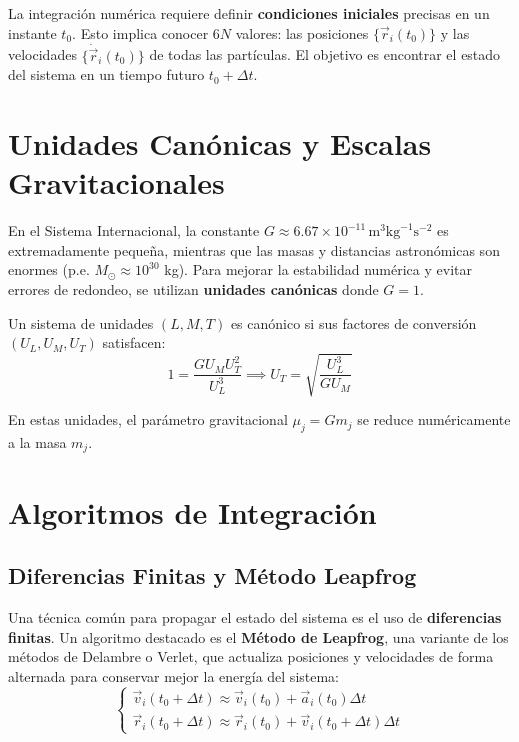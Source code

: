 \documentclass[a4paper]{article}
\begin{document}
La integración numérica requiere definir \textbf{condiciones iniciales} precisas en un instante $t_0$. Esto implica conocer $6N$ valores: las posiciones $\{ \vec{r}_i(t_0) \}$ y las velocidades $\{ \dot{\vec{r}}_i(t_0) \}$ de todas las partículas. El objetivo es encontrar el estado del sistema en un tiempo futuro $t_0 + \Delta t$.

\section{Unidades Canónicas y Escalas Gravitacionales}

En el Sistema Internacional, la constante $G \approx 6.67 \times 10^{-11} \, \text{m}^3\text{kg}^{-1}\text{s}^{-2}$ es extremadamente pequeña, mientras que las masas y distancias astronómicas son enormes (p.e. $M_{\odot} \approx 10^{30}$ kg). Para mejorar la estabilidad numérica y evitar errores de redondeo, se utilizan \textbf{unidades canónicas} donde $G = 1$.

Un sistema de unidades $(L, M, T)$ es canónico si sus factores de conversión $(U_L, U_M, U_T)$ satisfacen:
\begin{equation}
    1 = \frac{G U_M U_T^2}{U_L^3} \implies U_T = \sqrt{\frac{U_L^3}{G U_M}}
\end{equation}

En estas unidades, el parámetro gravitacional $\mu_j = G m_j$ se reduce numéricamente a la masa $m_j$.

\section{Algoritmos de Integración}

\subsection{Diferencias Finitas y Método Leapfrog}
Una técnica común para propagar el estado del sistema es el uso de \textbf{diferencias finitas}. Un algoritmo destacado es el \textbf{Método de Leapfrog}, una variante de los métodos de Delambre o Verlet, que actualiza posiciones y velocidades de forma alternada para conservar mejor la energía del sistema:
\begin{equation}
    \begin{cases} 
    \vec{v}_i(t_0 + \Delta t) \approx \vec{v}_i(t_0) + \vec{a}_i(t_0) \Delta t \\
    \vec{r}_i(t_0 + \Delta t) \approx \vec{r}_i(t_0) + \vec{v}_i(t_0 + \Delta t) \Delta t 
    \end{cases}
\end{equation}
\end{document}
